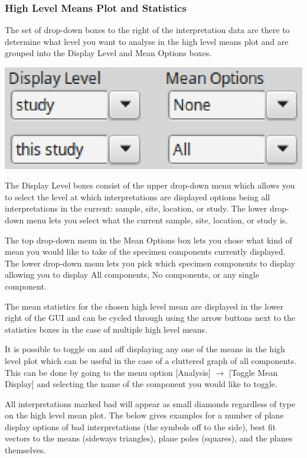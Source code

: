 \documentclass[11pt]{book}
\begin{document}
{{\subsubsection{High Level Means Plot and
Statistics}\label{higher-level-plots-and-interpretation}

The set of drop-down boxes to the right of the interpretation data are there to determine what level you want to analyse in the high level means plot and are grouped into the Display Level and Mean Options boxes.

\includegraphics[width=8 cm]{EPSFiles/demag_gui_HighLevel.eps}

\noindent The Display Level boxes consist of the upper drop-down menu which allows you to select the level at which interpretations are displayed options being all interpretations in the current: sample, site, location, or study. The lower drop-down menu lets you select what the current sample, site, location, or study is.

\noindent The top drop-down menu in the Mean Options box lets you chose what kind of mean you would like to take of the specimen components currently displayed. The lower drop-down menu lets you pick which specimen components to display allowing you to display All components, No components, or any single component.

\noindent The mean statistics for the chosen high level mean are displayed in the lower right of the GUI and can be cycled through using the arrow buttons next to the statistics boxes in the case of multiple high level means.

\noindent It is possible to toggle on and off displaying any one of the means in the high level plot which can be useful in the case of a cluttered graph of all components. This can be done by going to the menu option [Analysis] $\rightarrow$ [Toggle Mean Display] and selecting the name of the component you would like to toggle.

\noindent All interpretations marked bad will appear as small diamonds regardless of type on the high level mean plot. The below gives examples for a number of plane display options of bad interpretations (the symbols off to the side), best fit vectors to the means (sideways triangles), plane poles (squares), and the planes themselves.

}}
\end{document}
